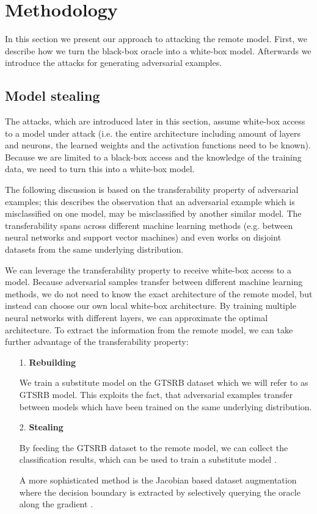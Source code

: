 
\section{Methodology}
\label{sec:methodology}

In this section we present our approach to attacking the remote model.
First, we describe how we turn the black-box oracle into a white-box model.
Afterwards we introduce the attacks for generating adversarial examples.

\subsection{Model stealing}

The attacks, which are introduced later in this section, assume white-box access to a model under attack
(i.e. the entire architecture including amount of layers and neurons, the learned weights and the activation functions need to be known).
Because we are limited to a black-box access and the knowledge of the training data, we need to turn this into a white-box model.

The following discussion is based on the transferability property of adversarial examples;
this describes the observation that an adversarial example which is misclassified on one model,
may be misclassified by another similar model.
The transferability spans across different machine learning methods
(e.g. between neural networks and support vector machines)
and even works on disjoint datasets from the same underlying distribution. \cite{papernot2016transferability,goodfellow6572explaining, szegedy2013intriguing}

We can leverage the transferability property to receive white-box access to a model.
Because adversarial samples transfer between different machine learning methods,
we do not need to know the exact architecture of the remote model,
but instead can choose our own local white-box architecture.
By training multiple neural networks with different layers,
we can approximate the optimal architecture.
To extract the information from the remote model, we can take further advantage of the transferability property:

\begin{enumerate}
\item[1.] \textbf{Rebuilding}

We train a substitute model on the GTSRB dataset which we will refer to as GTSRB model.
This exploits the fact, that adversarial examples transfer between models which have been trained on the same underlying distribution.

\item[2.] \textbf{Stealing}

By feeding the GTSRB dataset to the remote model, we can collect the classification results, which can be used to train a substitute model \cite{tramer2016stealing}.

A more sophisticated method is the Jacobian based dataset augmentation where the decision boundary is extracted by selectively querying the oracle along the gradient \cite{papernot2017practical}.
\end{enumerate}

